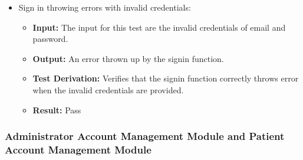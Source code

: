 \documentclass[12pt, titlepage]{article}
\begin{document}
\begin{enumerate}
\begin{itemize}
    \item Sign in throwing errors with invalid credentials: 

    \begin{itemize}
      \item \textbf{Input:} The input for this test are the invalid credentials of email and password. 
      \item \textbf{Output:} An error thrown up by the signin function.
      \item \textbf{Test Derivation:} Verifies that the signin function correctly throws error when the invalid credentials are provided.
      \item \textbf{Result:} Pass
    \end{itemize}
  \end{itemize}
\end{enumerate}

\subsubsection{Administrator Account Management Module and Patient Account Management Module}
\end{document}
